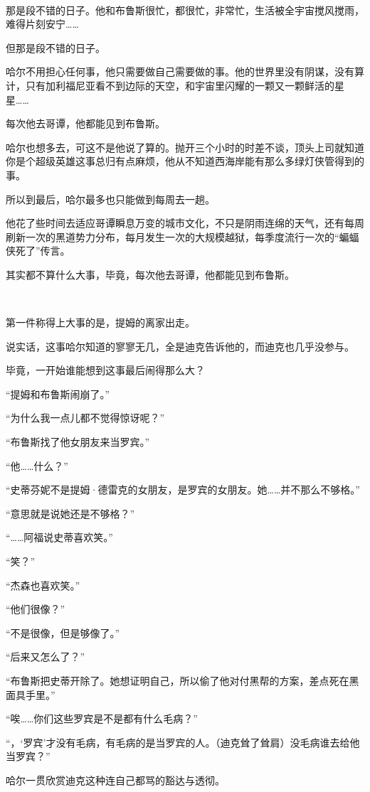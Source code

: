 \documentclass[../main]{subfiles}
\begin{document}
~\

那是段不错的日子。他和布鲁斯很忙，都很忙，非常忙，生活被全宇宙搅风搅雨，难得片刻安宁……

但那是段不错的日子。

哈尔不用担心任何事，他只需要做自己需要做的事。他的世界里没有阴谋，没有算计，只有加利福尼亚看不到边际的天空，和宇宙里闪耀的一颗又一颗鲜活的星星……

每次他去哥谭，他都能见到布鲁斯。

哈尔也想多去，可这不是他说了算的。抛开三个小时的时差不谈，顶头上司就知道你是个超级英雄这事总归有点麻烦，他从不知道西海岸能有那么多绿灯侠管得到的事。

所以到最后，哈尔最多也只能做到每周去一趟。

他花了些时间去适应哥谭瞬息万变的城市文化，不只是阴雨连绵的天气，还有每周刷新一次的黑道势力分布，每月发生一次的大规模越狱，每季度流行一次的“蝙蝠侠死了”传言。

其实都不算什么大事，毕竟，每次他去哥谭，他都能见到布鲁斯。

~\

第一件称得上大事的是，提姆的离家出走。

说实话，这事哈尔知道的寥寥无几，全是迪克告诉他的，而迪克也几乎没参与。

毕竟，一开始谁能想到这事最后闹得那么大？

“提姆和布鲁斯闹崩了。”

“为什么我一点儿都不觉得惊讶呢？”

“布鲁斯找了他女朋友来当罗宾。”

“他……什么？”

“史蒂芬妮不是提姆·德雷克的女朋友，是罗宾的女朋友。她……并不那么不够格。”

“意思就是说她还是不够格？”

“……阿福说史蒂喜欢笑。”

“笑？”

“杰森也喜欢笑。”

“他们很像？”

“不是很像，但是够像了。”

“后来又怎么了？”

“布鲁斯把史蒂开除了。她想证明自己，所以偷了他对付黑帮的方案，差点死在黑面具手里。”

“唉……你们这些罗宾是不是都有什么毛病？”

“，‘罗宾’才没有毛病，有毛病的是当罗宾的人。（迪克耸了耸肩）没毛病谁去给他当罗宾？”

哈尔一贯欣赏迪克这种连自己都骂的豁达与透彻。

~\
\end{document}
